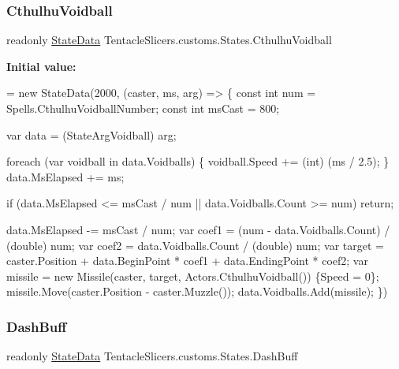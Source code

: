 \subsubsection{\texorpdfstring{Cthulhu\+Voidball}{CthulhuVoidball}}
{\footnotesize\ttfamily readonly \hyperlink{class_tentacle_slicers_1_1states_1_1_state_data}{State\+Data} Tentacle\+Slicers.\+customs.\+States.\+Cthulhu\+Voidball\hspace{0.3cm}{\ttfamily [static]}}

{\bfseries Initial value\+:}
\begin{DoxyCode}
= \textcolor{keyword}{new} StateData(2000, (caster, ms, arg) =>
        \{
            \textcolor{keyword}{const} \textcolor{keywordtype}{int} num = Spells.CthulhuVoidballNumber;
            \textcolor{keyword}{const} \textcolor{keywordtype}{int} msCast = 800;

            var data = (StateArgVoidball) arg;

            \textcolor{keywordflow}{foreach} (var voidball \textcolor{keywordflow}{in} data.Voidballs)
            \{
                voidball.Speed += (int) (ms / 2.5);
            \}
            data.MsElapsed += ms;

            \textcolor{keywordflow}{if} (data.MsElapsed <= msCast / num ||
                data.Voidballs.Count >= num) \textcolor{keywordflow}{return};

            data.MsElapsed -= msCast / num;
            var coef1 = (num - data.Voidballs.Count) / (\textcolor{keywordtype}{double}) num;
            var coef2 = data.Voidballs.Count / (double) num;
            var target = caster.Position + data.BeginPoint * coef1 + data.EndingPoint * coef2;
            var missile = \textcolor{keyword}{new} Missile(caster, target, Actors.CthulhuVoidball()) \{Speed = 0\};
            missile.Move(caster.Position - caster.Muzzle());
            data.Voidballs.Add(missile);
        \})
\end{DoxyCode}
\mbox{\label{class_tentacle_slicers_1_1customs_1_1_states_a52c519e63e2d28fedbf29caa9e65242a}} 
\subsubsection{\texorpdfstring{Dash\+Buff}{DashBuff}}
{\footnotesize\ttfamily readonly \hyperlink{class_tentacle_slicers_1_1states_1_1_state_data}{State\+Data} Tentacle\+Slicers.\+customs.\+States.\+Dash\+Buff\hspace{0.3cm}{\ttfamily [static]}}

